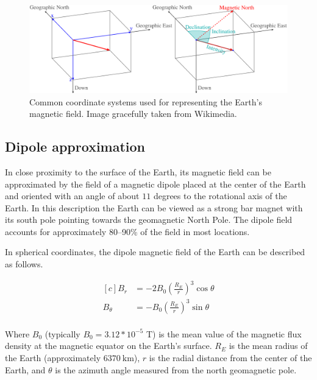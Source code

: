 \begin{figure}[hbt!]
    \centering
    \includegraphics[width=1.0\textwidth]{figures/earth_magnetic_field_coords.png}
    \caption{Common coordinate systems used for representing the Earth's magnetic field. Image gracefully taken from Wikimedia.\cite{wikimedia_magcoords_image}}
    \label{fig:earth_magnetic_field_coords}
\end{figure}

\subsection{Dipole approximation}
\label{subsec:diple_approx}

In close proximity to the surface of the Earth, its magnetic field can be approximated by the field of a magnetic dipole placed at the center of the Earth and oriented with an angle of about $11$ degrees to the rotational axis of the Earth. In this description the Earth can be viewed as a strong bar magnet with its south pole pointing towards the geomagnetic North Pole. The dipole field accounts for approximately 80--90\% of the field in most locations.\cite{earth_magnetic}

In spherical coordinates, the dipole magnetic field of the Earth can be described as follows.\cite{earth_dipole}

\begin{equation}
\label{eq:dipole_approx}
    \begin{aligned}[c]
        B_r &= -2 B_0 ({\frac{R_E}{r}})^3 \cos \theta\\
        B_\theta &= - B_0 ({\frac{R_E}{r}})^3 \sin \theta\\
    \end{aligned}
\end{equation}

Where $B_0$ (typically $B_0 = 3.12*10^{-5}$ T) is the mean value of the magnetic flux density at the magnetic equator on the Earth's surface. $R_E$ is the mean radius of the Earth (approximately $6370\ \textrm{km}$), $r$ is the radial distance from the center of the Earth, and $\theta$ is the azimuth angle measured from the north geomagnetic pole.

